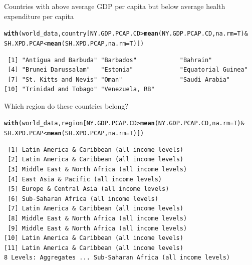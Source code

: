 \documentclass{article}\usepackage[]{graphicx}\usepackage[]{color}
\makeatletter
\newcommand{\hlopt}[1]{\textcolor[rgb]{0,0,0}{#1}}%
\newcommand{\hlstd}[1]{\textcolor[rgb]{0.345,0.345,0.345}{#1}}%
\newcommand{\hlkwc}[1]{\textcolor[rgb]{0.333,0.667,0.333}{#1}}%
\newcommand{\hlkwd}[1]{\textcolor[rgb]{0.737,0.353,0.396}{\textbf{#1}}}%
\newenvironment{kframe}{%
 \def\at@end@of@kframe{}%
 \ifinner\ifhmode%
  \def\at@end@of@kframe{\end{minipage}}%
  \begin{minipage}{\columnwidth}%
 \fi\fi%
 \def\FrameCommand##1{\hskip\@totalleftmargin \hskip-\fboxsep
 \colorbox{shadecolor}{##1}\hskip-\fboxsep
     \hskip-\linewidth \hskip-\@totalleftmargin \hskip\columnwidth}%
 \MakeFramed {\advance\hsize-\width
   \@totalleftmargin\z@ \linewidth\hsize
   \@setminipage}}%
 {\par\unskip\endMakeFramed%
 \at@end@of@kframe}
\newenvironment{knitrout}{}{} %
\makeatother
\begin{document}
\begin{enumerate}
Countries with above average GDP per capita but below average health expenditure per capita
\begin{knitrout}
\color{fgcolor}\begin{kframe}
\begin{alltt}
\hlkwd{with}\hlstd{(world_data, country[NY.GDP.PCAP.CD} \hlopt{>} \hlkwd{mean}\hlstd{(NY.GDP.PCAP.CD,} \hlkwc{na.rm}\hlstd{=T)} \hlopt{&}
                           \hlstd{SH.XPD.PCAP} \hlopt{<} \hlkwd{mean}\hlstd{(SH.XPD.PCAP,} \hlkwc{na.rm}\hlstd{=T)])}
\end{alltt}
\begin{verbatim}
 [1] "Antigua and Barbuda" "Barbados"            "Bahrain"            
 [4] "Brunei Darussalam"   "Estonia"             "Equatorial Guinea"  
 [7] "St. Kitts and Nevis" "Oman"                "Saudi Arabia"       
[10] "Trinidad and Tobago" "Venezuela, RB"      
\end{verbatim}
\end{kframe}
\end{knitrout}

Which region do these countries belong?
\begin{knitrout}
\color{fgcolor}\begin{kframe}
\begin{alltt}
\hlkwd{with}\hlstd{(world_data, region[NY.GDP.PCAP.CD} \hlopt{>} \hlkwd{mean}\hlstd{(NY.GDP.PCAP.CD,} \hlkwc{na.rm}\hlstd{=T)} \hlopt{&}
                           \hlstd{SH.XPD.PCAP} \hlopt{<} \hlkwd{mean}\hlstd{(SH.XPD.PCAP,} \hlkwc{na.rm}\hlstd{=T)])}
\end{alltt}
\begin{verbatim}
 [1] Latin America & Caribbean (all income levels) 
 [2] Latin America & Caribbean (all income levels) 
 [3] Middle East & North Africa (all income levels)
 [4] East Asia & Pacific (all income levels)       
 [5] Europe & Central Asia (all income levels)     
 [6] Sub-Saharan Africa (all income levels)        
 [7] Latin America & Caribbean (all income levels) 
 [8] Middle East & North Africa (all income levels)
 [9] Middle East & North Africa (all income levels)
[10] Latin America & Caribbean (all income levels) 
[11] Latin America & Caribbean (all income levels) 
8 Levels: Aggregates ... Sub-Saharan Africa (all income levels)
\end{verbatim}
\end{kframe}
\end{knitrout}


\end{enumerate}
\end{document}
